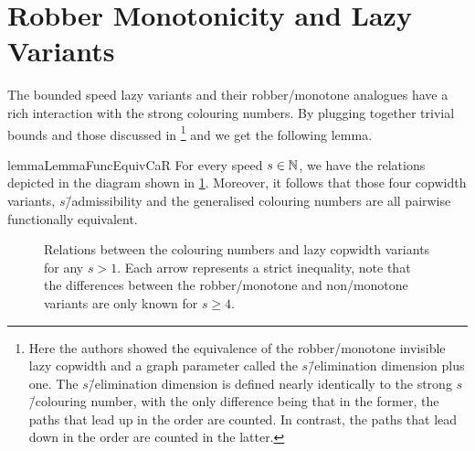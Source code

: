 \section{Robber Monotonicity and Lazy Variants}
\label{SecitonColouringNumbers}
The bounded speed lazy variants and their robber\-/monotone analogues have a rich interaction with the strong colouring numbers. By plugging together trivial bounds and those discussed in \cite{dendris1997fugitive}\footnote{Here the authors showed the equivalence of the robber\-/monotone invisible lazy copwidth and a graph parameter called the $s$\=/elimination dimension plus one. The $s$\=/elimination dimension is defined nearly identically to the strong $s$\=/colouring number, with the only difference being that in the former, the paths that lead up in the order are counted. In contrast, the paths that lead down in the order are counted in the latter.} and \cite{torunczyk2023flip} we get the following lemma.
\begin{restatable}{lemma}{LemmaFuncEquivCaR}
    For every speed $s\in \mathbb{N}$, we have the relations depicted in the diagram shown in \cref{fig:LazyAndCoulorNumbers}. Moreover, it follows that those four copwidth variants, $s$\=/admissibility and the generalised colouring numbers are all pairwise functionally equivalent.
\end{restatable}

\begin{figure}
    \centering
    \caption{Relations between the colouring numbers and lazy copwidth variants for any $s>1$. Each arrow represents a strict inequality, note that the differences between the robber\-/monotone and non\-/monotone variants are only known for $s\geq 4$.}
    \label{fig:LazyAndCoulorNumbers}
\end{figure}


